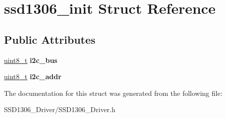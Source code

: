 \hypertarget{structssd1306__init}{}\section{ssd1306\+\_\+init Struct Reference}
\label{structssd1306__init}
\subsection*{Public Attributes}
\begin{DoxyCompactItemize}
\item 
\mbox{\label{structssd1306__init_aad496fa83a8fb52d4fbe0963110f9f42}} 
\hyperlink{vl53l0x__types_8h_aba7bc1797add20fe3efdf37ced1182c5}{uint8\+\_\+t} {\bfseries i2c\+\_\+bus}
\item 
\mbox{\label{structssd1306__init_ac81c6354f84be18b4dbe48ee6d1c2ce5}} 
\hyperlink{vl53l0x__types_8h_aba7bc1797add20fe3efdf37ced1182c5}{uint8\+\_\+t} {\bfseries i2c\+\_\+addr}
\end{DoxyCompactItemize}


The documentation for this struct was generated from the following file\+:\begin{DoxyCompactItemize}
\item 
S\+S\+D1306\+\_\+\+Driver/S\+S\+D1306\+\_\+\+Driver.\+h\end{DoxyCompactItemize}
